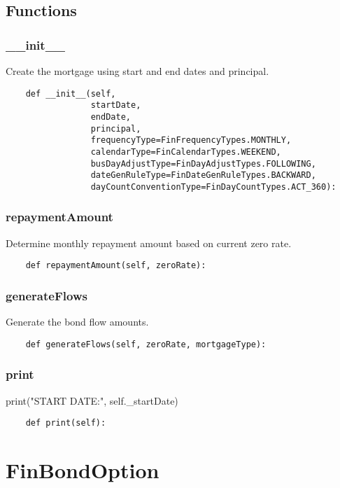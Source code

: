 \documentclass[twoside,11pt]{book}
\begin{document}
\subsection*{Functions}

\subsubsection*{{\bf \_\_init\_\_}}
Create the mortgage using start and end dates and principal.  

\begin{lstlisting}
    def __init__(self,
                 startDate,
                 endDate,
                 principal,
                 frequencyType=FinFrequencyTypes.MONTHLY,
                 calendarType=FinCalendarTypes.WEEKEND,
                 busDayAdjustType=FinDayAdjustTypes.FOLLOWING,
                 dateGenRuleType=FinDateGenRuleTypes.BACKWARD,
                 dayCountConventionType=FinDayCountTypes.ACT_360):
\end{lstlisting}

\subsubsection*{{\bf repaymentAmount}}
Determine monthly repayment amount based on current zero rate.  

\begin{lstlisting}
    def repaymentAmount(self, zeroRate):
\end{lstlisting}

\subsubsection*{{\bf generateFlows}}
Generate the bond flow amounts.  

\begin{lstlisting}
    def generateFlows(self, zeroRate, mortgageType):
\end{lstlisting}

\subsubsection*{{\bf print}}
print("START DATE:", self.\_startDate) 

\begin{lstlisting}
    def print(self):
\end{lstlisting}

\newpage
\section{FinBondOption}
\end{document}
